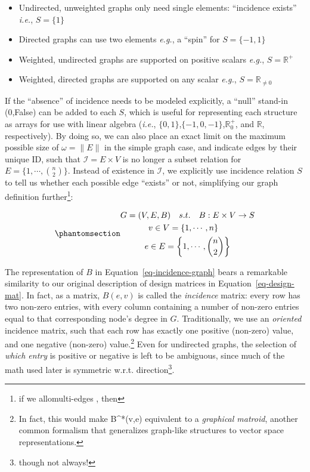 \documentclass[%
	12pt,
		oneside,
		letterpaper
]{book}
\providecommand{\tightlist}{%
  \setlength{\itemsep}{0pt}\setlength{\parskip}{0pt}}\usepackage{longtable,booktabs,array}
\begin{document}
\begin{itemize}
\tightlist
\item
  Undirected, unweighted graphs only need single elements: ``incidence exists'' \emph{i.e.}, \(S=\{1\}\)
\item
  Directed graphs can use two elements \emph{e.g.}, a ``spin'' for \(S=\{-1,1\}\)
\item
  Weighted, undirected graphs are supported on positive scalars \emph{e.g.}, \(S=\mathbb{R}^+\)
\item
  Weighted, directed graphs are supported on any scalar \emph{e.g.}, \(S=\mathbb{R}_{\neq0}\)
\end{itemize}

If the ``absence'' of incidence needs to be modeled explicitly, a ``null'' stand-in (0,False) can be added to each \(S\), which is useful for representing each structure as arrays for use with linear algebra (\emph{i.e.}, \(\{0,1\}\),\(\{-1,0,-1\}\),\(\mathbb{R}^+_0\), and \(\mathbb{R}\), respectively).
By doing so, we can also place an exact limit on the maximum possible size of \(\omega=\|E\|\) in the simple graph case, and indicate edges by their unique ID, such that \(\mathcal{I}= E\times V\) is no longer a subset relation for \(E=\{1,\cdots,{n\choose2} \}\).
Instead of existence in \(\mathcal{I}\), we explicitly use incidence relation \(S\) to tell us whether each possible edge ``exists'' or not, simplifying our graph definition further\footnote{
  if we allomulti-edges
  , then}:

\begin{equation}\phantomsection\label{eq-incidence-graph}{
\begin{gathered}
G  = (V,E,B) \quad s.t. \quad B : E\times V \rightarrow S\\
v \in V = \{1,\cdots, n\}\quad \\
e \in E = \left\{1,\cdots, {n\choose 2} \right\}
\end{gathered}
}\end{equation}

The representation of \(B\) in Equation~\ref{eq-incidence-graph} bears a remarkable similarity to our original description of design matrices in Equation~\ref{eq-design-mat}.
In fact, as a matrix, \(B(e,v)\) is called the \emph{incidence} matrix: every row has two non-zero entries, with every column containing a number of non-zero entries equal to that corresponding node's degree in \(G\).
Traditionally, we use an \emph{oriented} incidence matrix, such that each row has exactly one positive (non-zero) value, and one negative (non-zero) value.\footnote{
  In fact, this would make B\^{}*(v,e) equivalent to a \emph{graphical matroid}, another common formalism that generalizes graph-like structures to vector space representations.}
Even for undirected graphs, the selection of \emph{which entry} is positive or negative is left to be ambiguous, since much of the math used later is symmetric w.r.t. direction\footnote{though not always!}.
\end{document}
